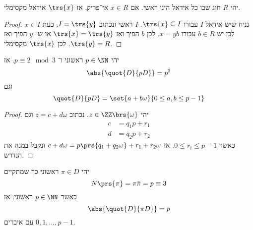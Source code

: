 \documentclass[a4paper,10pt,twoside,openany]{book}
\begin{document}
\begin{proposition}
יהי
$R$
חוג שבו כל אידאל הינו ראשי.
אם
$x \in R$
אי־פריק, אז
$\trs{x}$
אידאל מקסימלי.%
\flushleft{$\blacksquare$}
\end{proposition}

\begin{proof}
נניח שיש אידאל
$I$
עבורו
$\trs{x} \subseteq I$.
$I$
ראשי ונכתוב
$I = \trs{y}$.
כעת
$x \in I$
לכן יש
$b\in R$
עבורו
$x = yb$.
לכן
$b$
הפיך ואז
$\trs{x} = \trs{y}$
או ש־%
$y$
הפיך ואז
$\trs{y} = R$.
לכן
$\trs{x}$
מקסימלי.
\end{proof}

\begin{proposition}
יהי
$p \in \NN$
ראשוני ו־%
$p \equiv 2\mod{3}$.
אז
\[\abs{\quot{D}{pD}} = p^2\]
וגם
\[\quot{D}{pD} = \set{a + b\omega}{0 \leq a,b \leq p-1}\]
\end{proposition}
\begin{proof}
יהי
$z \in \ZZ\brs{\omega}$.
נכתוב
$z = c + d\omega$
וגם
\begin{align*}
c &= q_1 p + r_1 \\
d &= q_2 p + r_2
\end{align*}
כאשר
$0 \leq r_i \leq p-1$.
אז
$c+d\omega = p\prs{q_1 + q_2 \omega} + r_1 + r_2 \omega$
ונקבל במנה את הנדרש.
\end{proof}

\begin{proposition}
יהי
$\pi \in D$
ראשוני כך שמתקיים
\[N\prs{\pi} = \pi\bar{\pi} = p \equiv{3}\]
כאשר
$p \in \NN$
ראשוני.
אז
\[\abs{\quot{D}{\pi D}} = p\]
עם איברים
$0,1,\ldots, p-1$.
\end{proposition}
\end{document}
